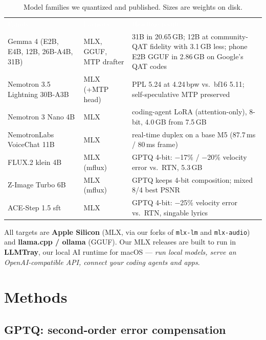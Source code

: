 \documentclass[10pt,letterpaper]{article}
\newcommand{\hd}[1]{\textcolor{white}{\interbold #1}}
\newcommand{\repo}[1]{\texttt{\small #1}}
\begin{document}
\begin{table}[H]
\centering\small
\caption{Model families we quantized and published. Sizes are weights on disk.}
\begin{tabularx}{\linewidth}{>{\raggedright\arraybackslash}p{1.55in}>{\raggedright\arraybackslash}p{1.15in}L}
\hd{Family} & \hd{Formats} & \hd{Headline result}\\
Gemma 4 (E2B, E4B, 12B, 26B-A4B, 31B) & MLX, GGUF, MTP drafter & 31B in 20.65\,GB; 12B at community-QAT fidelity with 3.1\,GB less; phone E2B GGUF in 2.86\,GB on Google's QAT codes \\
Nemotron 3.5 Lightning 30B-A3B & MLX (+MTP head) & PPL 5.24 at 4.24\,bpw vs.\ bf16 5.11; self-speculative MTP preserved \\
Nemotron 3 Nano 4B & MLX & coding-agent LoRA (attention-only), 8-bit, 4.0\,GB from 7.5\,GB \\
NemotronLabs VoiceChat 11B & MLX & real-time duplex on a base M5 (87.7\,ms / 80\,ms frame) \\
FLUX.2 klein 4B & MLX (mflux) & GPTQ 4-bit: −17\% / −20\% velocity error vs.\ RTN, 5.3\,GB \\
Z-Image Turbo 6B & MLX (mflux) & GPTQ keeps 4-bit composition; mixed 8/4 best PSNR \\
ACE-Step 1.5 sft & MLX & GPTQ 4-bit: −25\% velocity error vs.\ RTN, singable lyrics \\
\end{tabularx}
\end{table}

All targets are \textbf{Apple Silicon} (MLX, via our forks of \repo{mlx-lm} and \repo{mlx-audio}) and \textbf{llama.cpp / ollama} (GGUF). Our MLX releases are built to run in \textbf{LLMTray}, our local AI runtime for macOS --- \emph{run local models, serve an OpenAI-compatible API, connect your coding agents and apps}.

\clearpage
\section{Methods}

\subsection{GPTQ: second-order error compensation}
\end{document}

